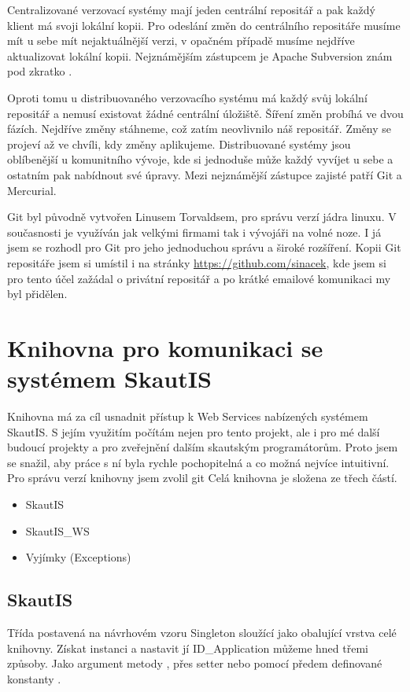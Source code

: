 \documentclass[thesis=B,czech]{FITthesis}[2011/06/14]
\begin{document}
Centralizované verzovací systémy mají jeden centrální repositář a pak každý klient má svoji lokální kopii. Pro odeslání změn do centrálního repositáře musíme mít u sebe mít nejaktuálnější verzi, v opačném případě musíme nejdříve aktualizovat lokální kopii. Nejznámějším zástupcem je Apache Subversion znám pod zkratko .

Oproti tomu u distribuovaného verzovacího systému má každý svůj lokální repositář a nemusí existovat žádné centrální úložiště. Šíření změn probíhá ve dvou fázích. Nejdříve změny stáhneme, což zatím neovlivnilo náš repositář. Změny se projeví až ve chvíli, kdy změny aplikujeme. Distribuované systémy jsou oblíbenější u komunitního vývoje, kde si jednoduše může každý vyvíjet u sebe a ostatním pak nabídnout své úpravy. Mezi nejznámější zástupce zajisté patří Git a Mercurial.

Git byl původně vytvořen Linusem Torvaldsem, pro správu verzí jádra linuxu. V současnosti je využíván jak velkými firmami tak i vývojáři na volné noze. I já jsem se rozhodl pro Git pro jeho jednoduchou správu a široké rozšíření. Kopii Git repositáře jsem si umístil i na stránky \url{https://github.com/sinacek}, kde jsem si pro tento účel zažádal o privátní repositář a po krátké emailové komunikaci my byl přidělen.

\section{Knihovna pro komunikaci se systémem SkautIS}
Knihovna má za cíl usnadnit přístup k Web Services nabízených systémem SkautIS. S jejím využitím počítám nejen pro tento projekt, ale i pro mé další budoucí projekty a pro zveřejnění dalším skautským programátorům. Proto jsem se snažil, aby práce s ní byla rychle pochopitelná a co možná nejvíce intuitivní. Pro správu verzí knihovny jsem zvolil git
Celá knihovna je složena ze třech částí.
\begin{itemize}
	\item SkautIS
	\item SkautIS\_WS
	\item Vyjímky (Exceptions)
\end{itemize}

\subsection{SkautIS}
Třída postavená na návrhovém vzoru Singleton sloužící jako obalující vrstva celé knihovny. Získat instanci a nastavit jí ID\_Application můžeme hned třemi způsoby. Jako argument metody , přes setter  nebo pomocí předem definované konstanty .
\end{document}
